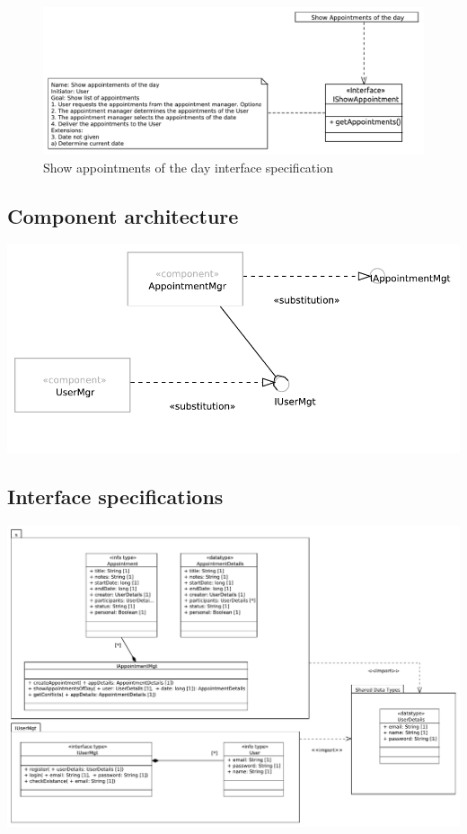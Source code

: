 \documentclass[a4paper]{scrartcl}
\begin{document}
\begin{figure}[H]
	\includegraphics[width=1\textwidth]{pictures/ShowAppointmentsOfTheDay}
	\caption{Show appointments of the day interface specification}
\end{figure}




\subsection{Component architecture}
\includegraphics[width=\textwidth]{pictures/ComponentArchitecture}

\subsection{Interface specifications}
\includegraphics[width=\textwidth]{pictures/InterfaceSpecification}
\end{document}
